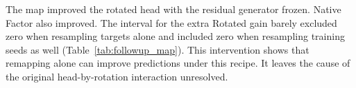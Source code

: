 The map improved the rotated head with the residual generator frozen.
Native Factor also improved. The interval for the extra Rotated gain
barely excluded zero when resampling targets alone and included zero
when resampling training seeds as well (Table~\ref{tab:followup_map}).
This intervention shows that remapping alone can improve predictions
under this recipe. It leaves the cause of the original head-by-rotation
interaction unresolved.

